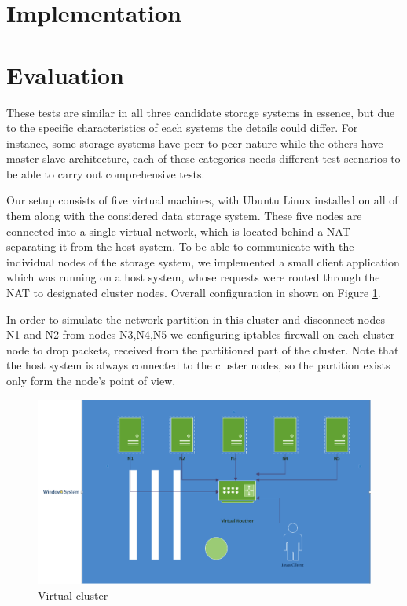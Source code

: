 \documentclass[a4paper]{article}
\begin{document}
\section{Implementation}



\section{Evaluation}

These tests are similar in all three candidate storage systems in essence, but due to the specific characteristics of each systems the details could differ. 
For instance, some storage systems have peer-to-peer nature while the others have master-slave architecture, each of these categories needs different test scenarios to be able to carry out comprehensive tests.

Our setup consists of five virtual machines, with Ubuntu Linux installed on all of them along with the considered data storage system. 
These five nodes are connected into a single virtual network, which is located behind a NAT separating it from the host system.
To be able to communicate with the individual nodes of the storage system, we implemented a small client application which was running on a host system, whose requests were routed through the NAT to designated cluster nodes. 
Overall configuration in shown on Figure \ref{fig:cluster}. 

In order to simulate the network partition in this cluster and disconnect nodes N1 and N2 from nodes N3,N4,N5 we configuring iptables firewall on each cluster node to drop packets, received from the partitioned part of the cluster.
Note that the host system is always connected to the cluster nodes, so the partition exists only form the node's point of view.

\begin{figure}[h!]
	\centering
	\includegraphics[width=\textwidth]{cluster}
	\caption{Virtual cluster}
	\label{fig:cluster}
\end{figure}
\end{document}
